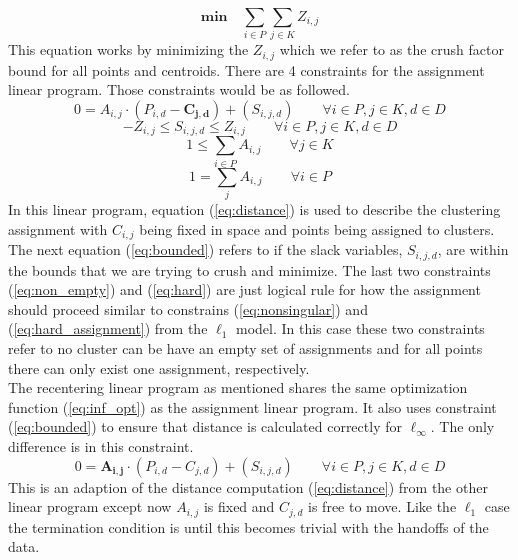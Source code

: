 \documentclass[a4paper,12pt]{article}
\numberwithin{equation}{section}
\begin{document}
\begin{equation}
 \textbf{min}  \quad \sum_{i\in P}\sum_{j\in K} Z_{i,j} 
 \label{eq:inf_opt}
\end{equation}
This equation works by minimizing the $Z_{i,j}$ which we refer to as the crush factor bound for all points and centroids.  There are 4 constraints for the assignment linear program. Those constraints would be as followed. 
\begin{equation}
0=A_{i,j}\cdot(P_{i,d}-\boldsymbol{C_{j,d}})+(S_{i,j,d}) \qquad \forall i \in P, j\in K, d \in D 
\label{eq:distance}
\end{equation}
\begin{equation}
-Z_{i,j} \leq S_{i,j,d} \leq Z_{i,j} \qquad \forall i \in P, j\in K, d \in D 
\label{eq:bounded}
\end{equation}
\begin{equation}
1\leq \sum_{i \in P} A_{i,j} \qquad \forall j \in K 
\label{eq:non_empty}
\end{equation}
\begin{equation}
1 = \sum_j A_{i,j} \qquad \forall i \in P
\label{eq:hard}
\end{equation}
In this linear program, equation (\ref{eq:distance}) is used to describe the clustering assignment with $C_{i,j}$ being fixed in space and points being assigned to clusters. The next equation (\ref{eq:bounded}) refers to if the slack variables, $S_{i,j,d}$, are within the bounds that we are trying to crush and minimize. The last two constraints (\ref{eq:non_empty}) and (\ref{eq:hard}) are just logical rule for how the assignment should proceed similar to constrains (\ref{eq:nonsingular}) and (\ref{eq:hard_assignment}) from the $\ell_1$ model. In this case these two constraints refer to no cluster can be have an empty set of assignments and for all points there can only exist one assignment, respectively. \\

The recentering linear program as mentioned shares the same optimization function (\ref{eq:inf_opt}) as the assignment linear program. It also uses constraint (\ref{eq:bounded}) to ensure that distance is calculated correctly for $\ell_\infty$. The only difference is in this constraint. 
\begin{equation}
0=\boldsymbol{A_{i,j}}\cdot(P_{i,d}-C_{j,d})+(S_{i,j,d}) \qquad \forall i \in P, j\in K, d \in D 
\label{eq:distance_alt}
\end{equation}
This is an adaption of the distance computation (\ref{eq:distance}) from the other linear program except now $A_{i,j}$ is fixed and $C_{j,d}$ is free to move. Like the $\ell_1$ case the termination condition is until this becomes trivial with the handoffs of the data.  
\end{document}
